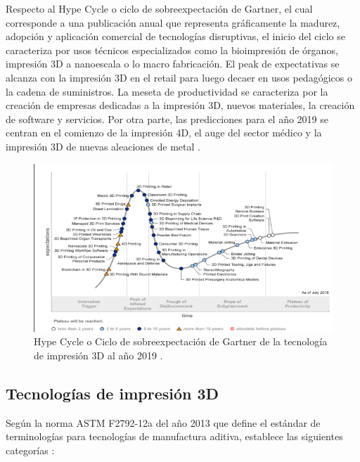 Respecto al Hype Cycle o ciclo de sobreexpectación de Gartner, el cual corresponde a una publicación anual que representa gráficamente la madurez, adopción y aplicación comercial de tecnologías disruptivas, el inicio del ciclo se caracteriza por usos técnicos especializados como la bioimpresión de órganos, impresión 3D a nanoescala o lo macro fabricación. El peak de expectativas se alcanza con la impresión 3D en el retail para luego decaer en usos pedagógicos o la cadena de suministros. La meseta de productividad se caracteriza por la creación de empresas dedicadas a la impresión 3D, nuevos materiales, la creación de software y servicios. Por otra parte, las predicciones para el año 2019 se centran en el comienzo de la impresión 4D, el auge del sector médico y la impresión 3D de nuevas aleaciones de metal \parencite{valdivieso2019}.

\begin{figure}[H]
\centering
\includegraphics[scale=0.8]{images/The3Dprintinghypecycle.png}
\caption{Hype Cycle o Ciclo de sobreexpectación de Gartner de la tecnología de impresión 3D al año 2019 \parencite{valdivieso2019}.}
\end{figure}
  

\subsection{Tecnologías de impresión 3D}

Según la norma ASTM F2792-12a del año 2013 que define el estándar de terminologías para tecnologías de manufactura aditiva, establece las siguientes categorías \parencite{astm2013}:

